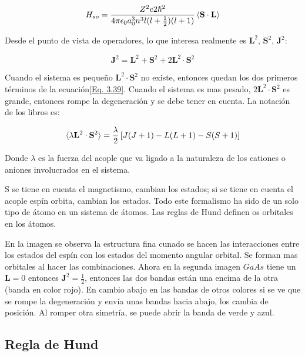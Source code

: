 \documentclass[11pt,fleqn]{book}
\renewcommand{\vec}[1]{\mathbf{#1}}
\begin{document}
\begin{equation}
    H_{so}= \frac{Z^{2}e{2}\hslash^{2}}{4\pi\epsilon_{0}a_{0}^{3}n^{3}l(l+\frac{1}{2})(l+1)}\braket{\vec{S}\cdot\vec{L}}
    \label{Eq. 3.38}
\end{equation}

Desde el punto de vista de operadores, lo que interesa realmente es $\vec{L}^{2}$, $\vec{S}^{2}$, $\vec{J}^{2}$:

\begin{equation}
    \vec{J}^{2}=\vec{L}^{2}+\vec{S}^{2}+2\vec{L}^{2}\cdot\vec{S}^{2}
    \label{Eq. 3.39}
\end{equation}

Cuando el sistema es pequeño $\vec{L}^{2}\cdot\vec{S}^{2}$ no existe, entonces quedan los dos primeros términos de la ecuación\ref{Eq. 3.39}. Cuando el sistema es mas pesado, $2\vec{L}^{2}\cdot\vec{S}^{2}$ es grande, entonces rompe la degeneración y se debe tener en cuenta.  La notación de los libros es:

\begin{equation}
    \braket{\lambda\vec{L}^{2}\cdot\vec{S}^{2}}=\frac{\lambda}{2}\left[J(J+1)-L(L+1)-S(S+1)\right]
    \label{Eq. 3.40}
\end{equation}

Donde $\lambda$ es la fuerza del acople que va ligado a la naturaleza de los cationes o aniones involucrados  en el sistema.

S se tiene en cuenta el magnetismo, cambian los estados; si se tiene en cuenta el acople espín orbita, cambian los estados. Todo este formalismo ha sido de un solo tipo de átomo en un sistema de átomos. Las reglas de Hund definen os orbitales en los átomos.


En la imagen se observa la estructura fina cunado se hacen las interacciones entre los estados del espín con los estados del momento angular orbital. Se forman mas orbitales al hacer las combinaciones. Ahora en la segunda imagen $GaAs$ tiene un $\vec{L}=0$ entonces $\vec{J}^{2}=\frac{1}{2}$, entonces las dos bandas están una encima de la otra (banda en color rojo). En cambio abajo en las bandas de otros colores si se ve que se rompe la degeneración y envía unas bandas hacia abajo, los cambia de posición. Al romper otra simetría, se puede abrir la banda de verde y azul.

\subsection{Regla de Hund}
\end{document}
